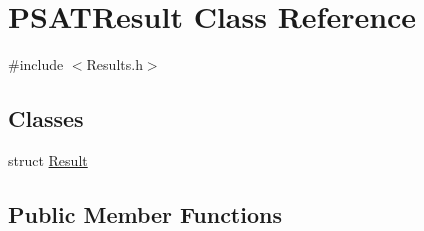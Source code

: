 \hypertarget{class_p_s_a_t_result}{}\section{P\+S\+A\+T\+Result Class Reference}
\label{class_p_s_a_t_result}


{\ttfamily \#include $<$Results.\+h$>$}

\subsection*{Classes}
\begin{DoxyCompactItemize}
\item 
struct \hyperlink{struct_p_s_a_t_result_1_1_result}{Result}
\end{DoxyCompactItemize}
\subsection*{Public Member Functions}
